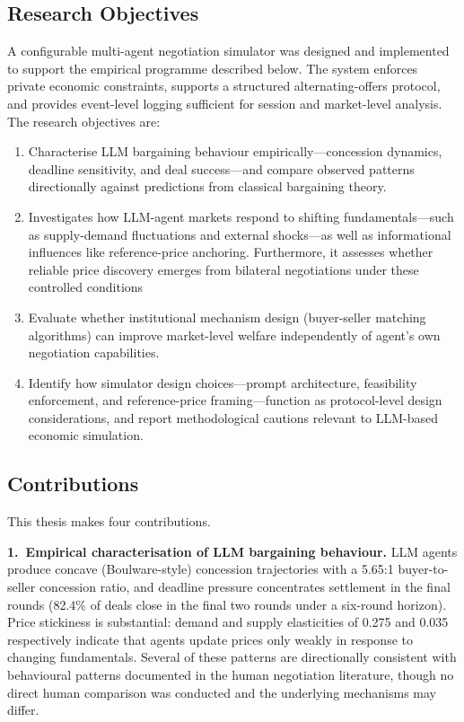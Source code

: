 \subsection{Research Objectives}

A configurable multi-agent negotiation simulator was designed and
implemented to support the empirical programme described below.  The system
enforces private economic constraints, supports a structured alternating-offers
protocol, and provides event-level logging sufficient for session and
market-level analysis.  The research objectives are:

\begin{enumerate}
    \item Characterise LLM bargaining behaviour empirically---concession
    dynamics, deadline sensitivity, and deal success---and compare observed
    patterns directionally against predictions from classical bargaining
    theory.

    \item Investigates how LLM-agent markets respond to shifting fundamentals—such as supply-demand fluctuations and external shocks—as well as informational influences like reference-price anchoring. Furthermore, it assesses whether reliable price discovery emerges from bilateral negotiations under these controlled conditions

    \item Evaluate whether institutional mechanism design (buyer-seller matching
    algorithms) can improve market-level welfare independently of agent's own negotiation capabilities.

    \item Identify how simulator design choices---prompt architecture,
    feasibility enforcement, and reference-price framing---function as
    protocol-level design considerations, and report methodological cautions relevant to
    LLM-based economic simulation.
\end{enumerate}

\subsection{Contributions}

This thesis makes four contributions.

\textbf{1.\ Empirical characterisation of LLM bargaining behaviour.}
LLM agents produce concave (Boulware-style) concession trajectories with
a 5.65:1 buyer-to-seller concession ratio, and deadline pressure
concentrates settlement in the final rounds (82.4\% of deals close in the
final two rounds under a six-round horizon).  Price stickiness is
substantial: demand and supply elasticities of 0.275 and 0.035
respectively indicate that agents update prices only weakly in response to
changing fundamentals.  Several of these patterns are directionally
consistent with behavioural patterns documented in the human negotiation
literature, though no direct human comparison was conducted and the
underlying mechanisms may differ.

